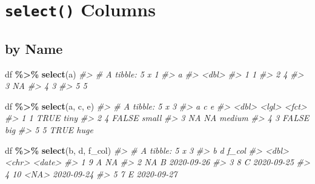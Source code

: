 \documentclass[
]{report}
\newenvironment{Shaded}{\begin{snugshade}}{\end{snugshade}}
\newcommand{\CommentTok}[1]{\textcolor[rgb]{0.56,0.35,0.01}{\textit{#1}}}
\newcommand{\KeywordTok}[1]{\textcolor[rgb]{0.13,0.29,0.53}{\textbf{#1}}}
\newcommand{\NormalTok}[1]{#1}
\newcommand{\OperatorTok}[1]{\textcolor[rgb]{0.81,0.36,0.00}{\textbf{#1}}}
\newcommand{\StringTok}[1]{\textcolor[rgb]{0.31,0.60,0.02}{#1}}
\begin{document}
\hypertarget{select-columns}{%
\section{\texorpdfstring{\texttt{select()} Columns}{select() Columns}}\label{select-columns}}

\hypertarget{by-name}{%
\subsection{by Name}\label{by-name}}

\begin{Shaded}
\begin{Highlighting}[]
\NormalTok{df }\OperatorTok{\%\textgreater{}\%}
\StringTok{  }\KeywordTok{select}\NormalTok{(a)}
\CommentTok{\#\textgreater{} \# A tibble: 5 x 1}
\CommentTok{\#\textgreater{}       a}
\CommentTok{\#\textgreater{}   \textless{}dbl\textgreater{}}
\CommentTok{\#\textgreater{} 1     1}
\CommentTok{\#\textgreater{} 2     4}
\CommentTok{\#\textgreater{} 3    NA}
\CommentTok{\#\textgreater{} 4     3}
\CommentTok{\#\textgreater{} 5     5}
\end{Highlighting}
\end{Shaded}

\begin{Shaded}
\begin{Highlighting}[]
\NormalTok{df }\OperatorTok{\%\textgreater{}\%}
\StringTok{  }\KeywordTok{select}\NormalTok{(a, c, e)}
\CommentTok{\#\textgreater{} \# A tibble: 5 x 3}
\CommentTok{\#\textgreater{}       a c     e     }
\CommentTok{\#\textgreater{}   \textless{}dbl\textgreater{} \textless{}lgl\textgreater{} \textless{}fct\textgreater{} }
\CommentTok{\#\textgreater{} 1     1 TRUE  tiny  }
\CommentTok{\#\textgreater{} 2     4 FALSE small }
\CommentTok{\#\textgreater{} 3    NA NA    medium}
\CommentTok{\#\textgreater{} 4     3 FALSE big   }
\CommentTok{\#\textgreater{} 5     5 TRUE  huge}
\end{Highlighting}
\end{Shaded}

\begin{Shaded}
\begin{Highlighting}[]
\NormalTok{df }\OperatorTok{\%\textgreater{}\%}
\StringTok{  }\KeywordTok{select}\NormalTok{(b, d, f\_col)}
\CommentTok{\#\textgreater{} \# A tibble: 5 x 3}
\CommentTok{\#\textgreater{}       b d     f\_col     }
\CommentTok{\#\textgreater{}   \textless{}dbl\textgreater{} \textless{}chr\textgreater{} \textless{}date\textgreater{}    }
\CommentTok{\#\textgreater{} 1     9 A     NA        }
\CommentTok{\#\textgreater{} 2    NA B     2020{-}09{-}26}
\CommentTok{\#\textgreater{} 3     8 C     2020{-}09{-}25}
\CommentTok{\#\textgreater{} 4    10 \textless{}NA\textgreater{}  2020{-}09{-}24}
\CommentTok{\#\textgreater{} 5     7 E     2020{-}09{-}27}
\end{Highlighting}
\end{Shaded}
\end{document}
